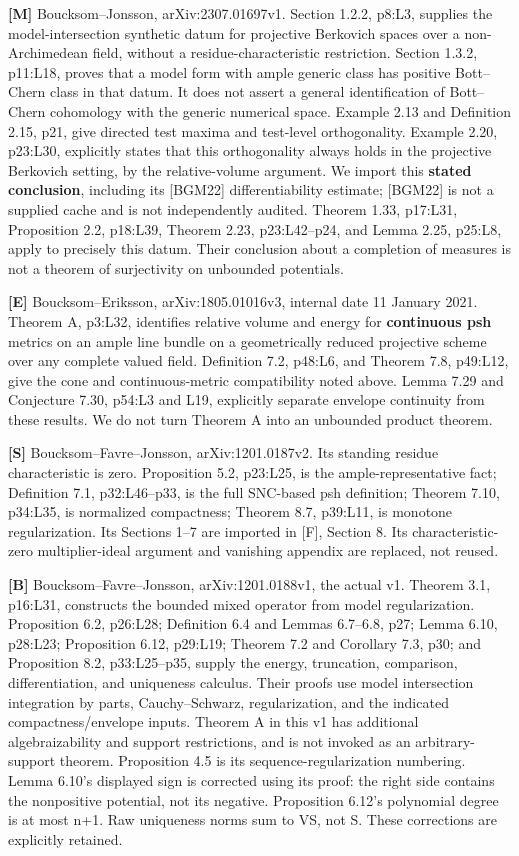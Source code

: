 \documentclass[11pt]{article}
\begin{document}
\noindent \textbf{[M]} Boucksom--Jonsson, arXiv:2307.01697v1. Section 1.2.2, p8:L3, supplies the model-intersection synthetic datum for projective Berkovich spaces over a non-Archimedean field, without a residue-characteristic restriction. Section 1.3.2, p11:L18, proves that a model form with ample generic class has positive Bott--Chern class in that datum. It does not assert a general identification of Bott--Chern cohomology with the generic numerical space. Example 2.13 and Definition 2.15, p21, give directed test maxima and test-level orthogonality. Example 2.20, p23:L30, explicitly states that this orthogonality always holds in the projective Berkovich setting, by the relative-volume argument. We import this \textbf{stated conclusion}, including its [BGM22] differentiability estimate; [BGM22] is not a supplied cache and is not independently audited. Theorem 1.33, p17:L31, Proposition 2.2, p18:L39, Theorem 2.23, p23:L42--p24, and Lemma 2.25, p25:L8, apply to precisely this datum. Their conclusion about a completion of measures is not a theorem of surjectivity on unbounded potentials.

\noindent \textbf{[E]} Boucksom--Eriksson, arXiv:1805.01016v3, internal date 11 January 2021. Theorem A, p3:L32, identifies relative volume and energy for \textbf{continuous psh} metrics on an ample line bundle on a geometrically reduced projective scheme over any complete valued field. Definition 7.2, p48:L6, and Theorem 7.8, p49:L12, give the cone and continuous-metric compatibility noted above. Lemma 7.29 and Conjecture 7.30, p54:L3 and L19, explicitly separate envelope continuity from these results. We do not turn Theorem A into an unbounded product theorem.

\noindent \textbf{[S]} Boucksom--Favre--Jonsson, arXiv:1201.0187v2. Its standing residue characteristic is zero. Proposition 5.2, p23:L25, is the ample-representative fact; Definition 7.1, p32:L46--p33, is the full SNC-based psh definition; Theorem 7.10, p34:L35, is normalized compactness; Theorem 8.7, p39:L11, is monotone regularization. Its Sections 1--7 are imported in [F], Section 8. Its characteristic-zero multiplier-ideal argument and vanishing appendix are replaced, not reused.

\noindent \textbf{[B]} Boucksom--Favre--Jonsson, arXiv:1201.0188v1, the actual v1. Theorem 3.1, p16:L31, constructs the bounded mixed operator from model regularization. Proposition 6.2, p26:L28; Definition 6.4 and Lemmas 6.7--6.8, p27; Lemma 6.10, p28:L23; Proposition 6.12, p29:L19; Theorem 7.2 and Corollary 7.3, p30; and Proposition 8.2, p33:L25--p35, supply the energy, truncation, comparison, differentiation, and uniqueness calculus. Their proofs use model intersection integration by parts, Cauchy--Schwarz, regularization, and the indicated compactness/envelope inputs. Theorem A in this v1 has additional algebraizability and support restrictions, and is not invoked as an arbitrary-support theorem. Proposition 4.5 is its sequence-regularization numbering. Lemma 6.10's displayed sign is corrected using its proof: the right side contains the nonpositive potential, not its negative. Proposition 6.12's polynomial degree is at most n+1. Raw uniqueness norms sum to VS, not S. These corrections are explicitly retained.
\end{document}
